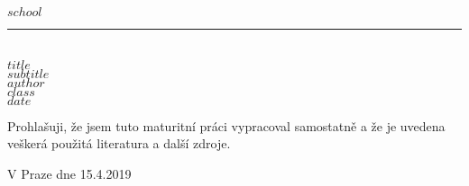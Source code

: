 \begin{titlepage}
    \begin{center}
        \vspace*{1cm}
        \textbf{\large $school$}\\
        \vspace{0.2cm}
        \rule{\textwidth}{0.5pt}\\
        \vspace{5cm}
        \textbf{\Huge $title$}\\
        \vspace{5cm}
        \textbf{\large $subtitle$}\\
        \vspace{2cm}
        \textbf{\large $author$}\\
        \textbf{$class$}\\
        \vspace*{\fill}
        \textbf{\large $date$}\\
    \end{center}
\end{titlepage}
\newpage
\vspace*{\fill}
Prohlašuji, že jsem tuto maturitní práci vypracoval samostatně a že je uvedena veškerá použitá literatura a další zdroje.\newline
\begin{minipage}{0.7\textwidth}
    \vspace{1cm}
    V Praze dne 15.4.2019
\end{minipage}
\begin{minipage}{0.3\textwidth}
    \vspace{1cm}
    \begin{flushright}
        \vspace{11pt}
        \hrulefill
    \end{flushright}
\end{minipage}
